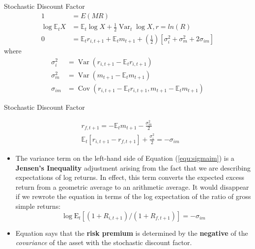 \documentclass{beamer}
\begin{document}
\begin{frame}{Stochastic Discount Factor}
	\begin{align}
		1 &= E (MR)\\
		\log \mathbb{E}_{t} X &=\mathbb{E}_{t} \log X+\frac{1}{2} \operatorname{Var}_{t} \log X, r = ln(R)\\
		0&=\mathbb{E}_{t} r_{i, t+1}+\mathbb{E}_{t} m_{t+1}+\left(\frac{1}{2}\right)\left[\sigma_{i}^{2}+\sigma_{m}^{2}+2 \sigma_{i m}\right]\label{equ:1}
	\end{align}
where
\begin{align*}
	\sigma^2_{i} &= \operatorname{Var}\left(r_{i, t+1}-\mathbb{E}_{t} r_{i, t+1}\right)\\
	\sigma^2_{m} &= \operatorname{Var}\left(m_{t+1}-\mathbb{E}_{t} m_{t+1}\right) \\
	\sigma_{im} &= \operatorname{Cov}\left(r_{i, t+1}-\mathbb{E}_{t} r_{i, t+1}, m_{t+1}-\mathbb{E}_{t} m_{t+1}\right)
\end{align*}
\end{frame}

\begin{frame}{Stochastic Discount Factor}

	\begin{equation}
	\begin{aligned}
		&r_{f, t+1}=-\mathbb{E}_{t} m_{t+1}-\frac{\sigma_{m}^{2}}{2} \\
		&\mathbb{E}_{t}\left[r_{i, t+1}-r_{f, t+1}\right]+\frac{\sigma_{i}^{2}}{2}=-\sigma_{im}\label{equ:sigmaim}
	\end{aligned}
	\end{equation}
\begin{itemize}
	\item The variance term on the left-hand side of Equation (\ref{equ:sigmaim}) is a \textbf{Jensen's Inequality} adjustment arising from the fact that we are describing expectations of log returns. In effect, this term converts the expected excess return from a geometric average to an arithmetic average. It would disappear if we rewrote the equation in terms of the log expectation of the ratio of gross simple returns:
	\begin{equation*}
		 \log \mathrm{E}_{t}\left[\left(1+R_{i, t+1}\right) /\left(1+R_{f, t+1}\right)\right]=-\sigma_{i m}
	\end{equation*}
	\item Equation says that the \textbf{risk premium} is determined by the
	\textbf{negative} of the \textit{covariance} of the asset with the stochastic discount factor.
\end{itemize}
\end{frame}
\end{document}
